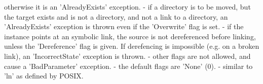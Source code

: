 \begin{myspec}
                  otherwise it is an 'AlreadyExists' exception.
                - if a directory is to be moved, but the target
                  exists and is not a directory, and not a link 
                  to a directory, an 'AlreadyExists' exception 
                  is thrown even if the 'Overwrite' flag is set. 
                - if the instance points at an symbolic link, 
                  the source is not dereferenced before linking, 
                  unless the 'Dereference' flag is given.  If
                  derefencing is impossible (e.g. on a broken 
                  link), an 'IncorrectState' exception is thrown.
                - other flags are not allowed, and cause a
                  'BadParameter' exception.
                - the default flags are 'None' (0).
                - similar to 'ln' as defined by POSIX.
 

\end{myspec}

